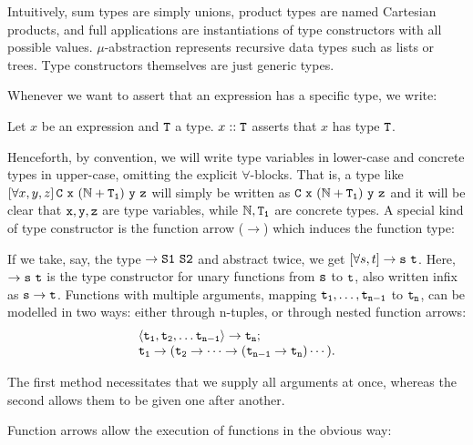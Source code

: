 Intuitively, sum types are simply unions, product types are named Cartesian products, and full applications are instantiations of type constructors with all possible values. $\mu$-abstraction represents recursive data types such as lists or trees. Type constructors themselves are just generic types.

Whenever we want to assert that an expression has a specific type, we write:

\begin{notation}
	Let $x$ be an expression and $\mathtt{T}$ a type. $x :: \mathtt{T}$ asserts that $x$ has type $\mathtt{T}$.
\end{notation}

Henceforth, by convention, we will write type variables in lower-case and concrete types in upper-case, omitting the explicit $\forall$-blocks. That is, a type like $\allQ{x,y,z} \type{C\ x\ (\N + T_1)\ y\ z}$ will simply be written as $\mathtt{C\ x\ (\mathbb{N} + T_1)\ y\ z}$ and it will be clear that $\mathtt{x}, \mathtt{y}, \mathtt{z}$ are type variables, while $\mathbb{N}, \mathtt{T_1}$ are concrete types. A special kind of type constructor is the function arrow ($\rightarrow$) which induces the function type:

\begin{example}
	If we take, say, the type $\rightarrow \mathtt{S1}\ \mathtt{S2}$  and abstract twice, we get $\left[\forall s,t \right] \rightarrow \mathtt{s}\ \mathtt{t}$. Here, $\rightarrow \mathtt{s}\ \mathtt{t}$ is the type constructor for unary functions from $\mathtt{s}$ to $\mathtt{t}$, also written infix as $\mathtt{s} \rightarrow \mathtt{t}$. Functions with multiple arguments, mapping $\mathtt{t_1},\dots,\mathtt{t_{n-1}}$ to $\mathtt{t_n}$, can be modelled in two ways: either through n-tuples, or through nested function arrows:
	$$
	\begin{array}{l}
	\langle \mathtt{t_1}, \mathtt{t_2}, \dots \mathtt{t_{n-1}} \rangle \rightarrow \mathtt{t_n};\\
	\mathtt{t_1} \rightarrow (\mathtt{t_2} \rightarrow \dots \rightarrow (\mathtt{t_{n-1}} \rightarrow \mathtt{t_n})\cdots).
	\end{array}
	$$
	
	The first method necessitates that we supply all arguments at once, whereas the second allows them to be given one after another.
\end{example}

\noindent
Function arrows allow the execution of functions in the obvious way:

